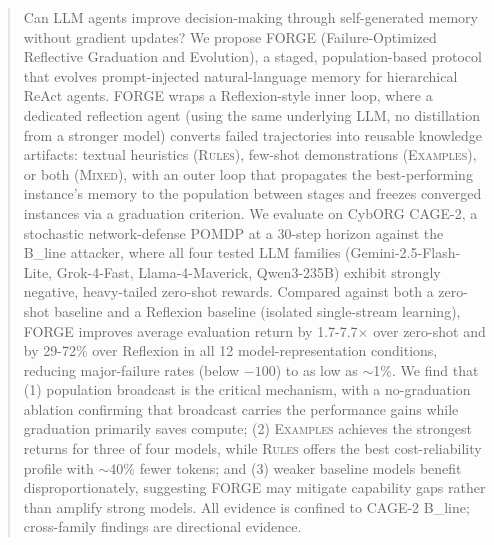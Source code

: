 \documentclass[sigconf]{acmart}
\begin{document}
\begin{abstract}
    Can LLM agents improve decision-making through self-generated memory without gradient updates? We propose FORGE (Failure-Optimized Reflective Graduation and Evolution), a staged, population-based protocol that evolves prompt-injected natural-language memory for hierarchical ReAct agents. FORGE wraps a Reflexion-style inner loop, where a dedicated reflection agent (using the same underlying LLM, no distillation from a stronger model) converts failed trajectories into reusable knowledge artifacts: textual heuristics (\textsc{Rules}), few-shot demonstrations (\textsc{Examples}), or both (\textsc{Mixed}), with an outer loop that propagates the best-performing instance's memory to the population between stages and freezes converged instances via a graduation criterion. We evaluate on CybORG CAGE-2, a stochastic network-defense POMDP at a 30-step horizon against the B\_line attacker, where all four tested LLM families (Gemini-2.5-Flash-Lite, Grok-4-Fast, Llama-4-Maverick, Qwen3-235B) exhibit strongly negative, heavy-tailed zero-shot rewards. Compared against both a zero-shot baseline and a Reflexion baseline (isolated single-stream learning), FORGE improves average evaluation return by 1.7-7.7$\times$ over zero-shot and by 29-72\% over Reflexion in all 12 model-representation conditions, reducing major-failure rates (below $-100$) to as low as $\sim$1\%. We find that (1) population broadcast is the critical mechanism, with a no-graduation ablation confirming that broadcast carries the performance gains while graduation primarily saves compute; (2) \textsc{Examples} achieves the strongest returns for three of four models, while \textsc{Rules} offers the best cost-reliability profile with $\sim$40\% fewer tokens; and (3) weaker baseline models benefit disproportionately, suggesting FORGE may mitigate capability gaps rather than amplify strong models. All evidence is confined to CAGE-2 B\_line; cross-family findings are directional evidence.
\end{abstract}
\end{document}
